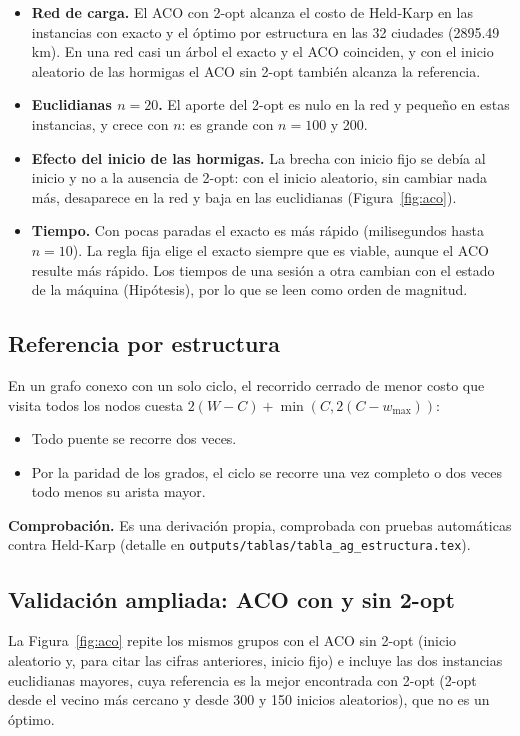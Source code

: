 \documentclass[12pt,a4paper]{article}
\begin{document}
\begin{itemize}
\item \textbf{Red de carga.} El ACO con 2-opt alcanza el costo de Held-Karp en
las instancias con exacto y el óptimo por estructura en las 32 ciudades
(2895.49 km). En una red casi un árbol el exacto y el ACO coinciden, y con el
inicio aleatorio de las hormigas el ACO sin 2-opt también alcanza la
referencia.
\item \textbf{Euclidianas $n = 20$.} El aporte del 2-opt es nulo en la red y
pequeño en estas instancias, y crece con $n$: es grande con $n = 100$ y 200.
\item \textbf{Efecto del inicio de las hormigas.} La brecha con inicio fijo se
debía al inicio y no a la ausencia de 2-opt: con el inicio aleatorio, sin
cambiar nada más, desaparece en la red y baja en las euclidianas
(Figura~\ref{fig:aco}).
\item \textbf{Tiempo.} Con pocas paradas el exacto es más rápido (milisegundos
hasta $n = 10$). La regla fija elige el exacto siempre que es viable, aunque el
ACO resulte más rápido. Los tiempos de una sesión a otra cambian con el estado
de la máquina (Hipótesis), por lo que se leen como orden de magnitud.
\end{itemize}

\subsection{Referencia por estructura}
\label{sec:estructura}

En un grafo conexo con un solo ciclo, el recorrido cerrado de menor costo que
visita todos los nodos cuesta $2(W - C) + \min(C, 2(C - w_{\max}))$:
\begin{itemize}
\item Todo puente se recorre dos veces.
\item Por la paridad de los grados, el ciclo se recorre una vez completo o dos
veces todo menos su arista mayor.
\end{itemize}

\textbf{Comprobación.} Es una derivación propia, comprobada con pruebas
automáticas contra Held-Karp (detalle en
\nolinkurl{outputs/tablas/tabla_ag_estructura.tex}).

\subsection{Validación ampliada: ACO con y sin 2-opt}

La Figura~\ref{fig:aco} repite los mismos grupos con el ACO sin
2-opt (inicio aleatorio y, para citar las cifras anteriores, inicio fijo) e
incluye las dos instancias euclidianas mayores, cuya referencia es la mejor
encontrada con 2-opt (2-opt desde el vecino más cercano y desde 300 y 150
inicios aleatorios), que no es un óptimo.
\end{document}

